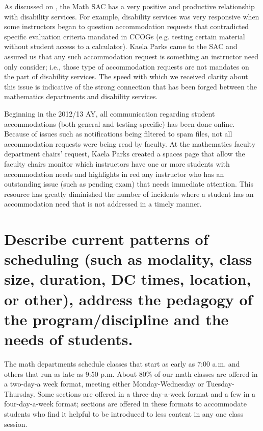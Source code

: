 
As discussed on ,
the Math SAC has a very positive and productive relationship with disability
services.  For example, disability services was very responsive when some
instructors began to question accommodation requests that contradicted specific
evaluation criteria mandated in CCOGs (e.g. testing certain material without
student access to a calculator).  Kaela Parks came to the SAC and assured us
that any such accommodation request is something an instructor need only
consider; i.e., those type of accommodation requests are not mandates on the
part of disability services.  The speed with which we received clarity about
this issue is indicative of the strong connection that has been forged between
the mathematics departments and disability services.

Beginning in the 2012/13 AY, all communication regarding student accommodations
(both general and testing-specific) has been done online.
Because of issues such as notifications being filtered to spam files, not all
accommodation requests were being read by faculty.  At the  mathematics faculty
department chairs' request, Kaela Parks created a spaces page that allow the
faculty chairs monitor which instructors have one or more students with
accommodation needs and highlights in red any instructor who has an outstanding
issue (such as pending exam) that needs immediate attention.  This resource has
greatly diminished the number of incidents where a student has an
accommodation need that is not addressed in a timely manner.

\section[Patterns of scheduling]{Describe current patterns of scheduling (such as modality, class size, duration, DC times, location, or other), address the pedagogy of the program/discipline and the needs of students.} 
\label{facilities:sec:scheduling}
The math departments schedule classes that start as early as 7:00 a.m. and
others that run as late as 9:50 p.m.  About 80\% of our math classes are offered
in a two-day-a week format, meeting either Monday-Wednesday or
Tuesday-Thursday.  Some sections are offered in a three-day-a-week format and a
few in a four-day-a-week format; sections are offered in these formats to
accommodate students who find it helpful to be introduced to less content in
any one class session.  

